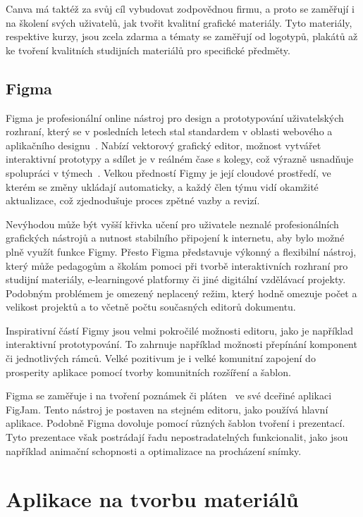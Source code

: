 Canva má taktéž za svůj cíl vybudovat zodpovědnou firmu, a proto se zaměřují i na školení svých uživatelů, jak tvořit kvalitní grafické materiály.
Tyto materiály, respektive kurzy, jsou zcela zdarma a tématy se zaměřují od logotypů, plakátů až ke tvoření kvalitních studijních materiálů pro specifické předměty.


\subsection{Figma}\label{text:figma_popis}

Figma je profesionální online nástroj pro design a prototypování uživatelských rozhraní, který se v posledních letech stal standardem v oblasti webového a aplikačního designu~\cite{figma_website}. 
Nabízí vektorový grafický editor, možnost vytvářet interaktivní prototypy a sdílet je v reálném čase s kolegy, což výrazně usnadňuje spolupráci v týmech~\cite{figma_website}. 
Velkou předností Figmy je její cloudové prostředí, ve kterém se změny ukládají automaticky, a každý člen týmu vidí okamžité aktualizace, což zjednodušuje proces zpětné vazby a revizí. 

Nevýhodou může být vyšší křivka učení pro uživatele neznalé profesionálních grafických nástrojů a nutnost stabilního připojení k internetu, aby bylo možné plně využít funkce Figmy. 
Přesto Figma představuje výkonný a flexibilní nástroj, který může pedagogům a školám pomoci při tvorbě interaktivních rozhraní pro studijní materiály, e-learningové platformy či jiné digitální vzdělávací projekty.
Podobným problémem je omezený neplacený režim, který hodně omezuje počet a velikost projektů a to včetně počtu současných editorů dokumentu.

Inspirativní částí Figmy jsou velmi pokročilé možnosti editoru, jako je například interaktivní prototypování.
To zahrnuje například možnosti přepínání komponent či jednotlivých rámců.
Velké pozitivum je i velké komunitní zapojení do prosperity aplikace pomocí tvorby komunitních rozšíření a šablon.

Figma se zaměřuje i na tvoření poznámek či pláten~\cite{figma_figjam} ve své dceřiné aplikaci FigJam.
Tento nástroj je postaven na stejném editoru, jako používá hlavní aplikace.
Podobně Figma dovoluje pomocí různých šablon tvoření i prezentací.
Tyto prezentace však postrádají řadu nepostradatelných funkcionalit, jako jsou například animační schopnosti a optimalizace na procházení snímky.

\section{Aplikace na tvorbu materiálů}\label{text:analyza/materialy}

